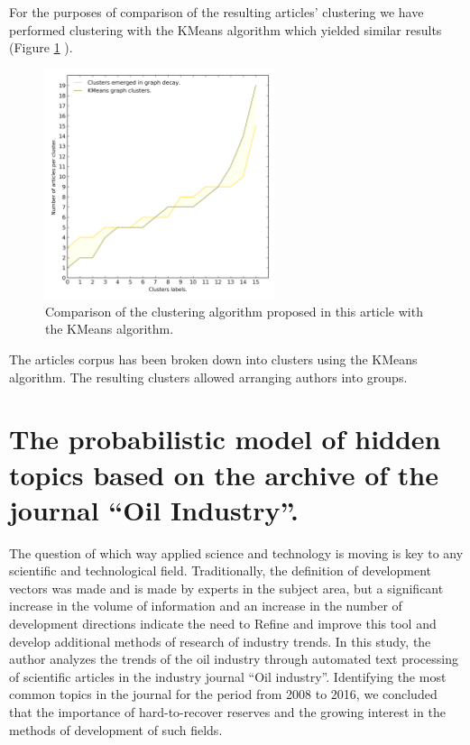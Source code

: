 \documentclass[12pt]{report}
\theoremstyle{definition}
\begin{document}
For the purposes of comparison of the resulting articles’ clustering we have performed clustering with the KMeans algorithm which yielded similar results (Figure \ref{fig:allo8} ).

\begin{figure}[ht]
	\centering
	\includegraphics[width=0.6\textwidth]{allo8eng.png}
	\caption{Comparison of the clustering algorithm proposed in this article with the KMeans algorithm.}
	\label{fig:allo8}
\end{figure}

The articles corpus has been broken down into clusters using the KMeans algorithm. 
The resulting clusters allowed arranging authors into groups.

\section{The probabilistic model of hidden topics based on the archive of the journal ``Oil Industry''.}

The question of which way applied science and technology is moving is key to any scientific and technological field. 
Traditionally, the definition of development vectors was made and is made by experts in the subject area, but a significant increase in the volume of information and an increase in the number of development directions indicate the need to Refine and improve this tool and develop additional methods of research of industry trends. 
In this study, the author analyzes the trends of the oil industry through automated text processing of scientific articles in the industry journal ``Oil industry''. 
Identifying the most common topics in the journal for the period from 2008 to 2016, we concluded that the importance of hard-to-recover reserves and the growing interest in the methods of development of such fields. 
\end{document}
